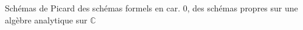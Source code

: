 
Schémas de Picard des schémas formels en car. 0,  des schémas propres sur une algèbre analytique sur $\mathbb{C}$

